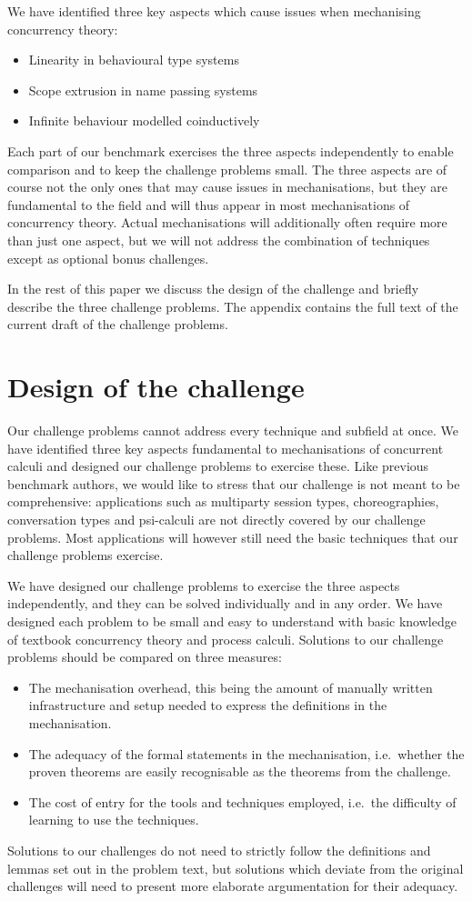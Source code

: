 \documentclass[submission,copyright,creativecommons]{eptcs}
\begin{document}
We have identified three key aspects which cause issues when mechanising concurrency theory:
\begin{itemize}
\item Linearity in behavioural type systems
\item Scope extrusion in name passing systems
\item Infinite behaviour modelled coinductively
\end{itemize}
Each part of our benchmark exercises the three aspects independently to enable comparison and to keep the challenge problems small.
The three aspects are of course not the only ones that may cause issues in mechanisations, but they are fundamental to the field and will thus appear in most mechanisations of concurrency theory.
Actual mechanisations will additionally often require more than just one aspect, but we will not address the combination of techniques except as optional bonus challenges.

In the rest of this paper we discuss the design of the challenge and briefly describe the three challenge problems.
The appendix contains the full text of the current draft of the challenge problems.

\section{Design of the challenge}
Our challenge problems cannot address every technique and subfield at once.
We have identified three key aspects fundamental to mechanisations of concurrent calculi and designed our challenge problems to exercise these.
Like previous benchmark authors, we would like to stress that our challenge is not meant to be comprehensive: applications such as multiparty session types, choreographies, conversation types and psi-calculi are not directly covered by our challenge problems.
Most applications will however still need the basic techniques that our challenge problems exercise.

We have designed our challenge problems to exercise the three aspects independently, and they can be solved individually and in any order.
We have designed each problem to be small and easy to understand with basic knowledge of textbook concurrency theory and process calculi.
Solutions to our challenge problems should be compared on three measures:
\begin{itemize}
\item The mechanisation overhead, this being the amount of manually written infrastructure and setup needed to express the definitions in the mechanisation.
\item The adequacy of the formal statements in the mechanisation, i.e.\ whether the proven theorems are easily recognisable as the theorems from the challenge.
\item The cost of entry for the tools and techniques employed, i.e.\ the difficulty of learning to use the techniques.
\end{itemize}
Solutions to our challenges do not need to strictly follow the definitions and lemmas set out in the problem text, but solutions which deviate from the original challenges will need to present more elaborate argumentation for their adequacy.
\end{document}
